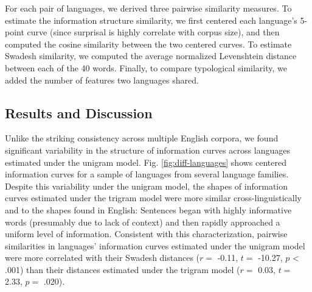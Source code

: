 \documentclass[10pt, letterpaper]{article}
\begin{document}
For each pair of languages, we derived three pairwise similarity
measures. To estimate the information structure similarity, we first
centered each language's 5-point curve (since surprisal is highly
correlate with corpus size), and then computed the cosine similarity
between the two centered curves. To estimate Swadesh similarity, we
computed the average normalized Levenshtein distance between each of the
40 words. Finally, to compare typological similarity, we added the
number of features two languages shared.

\hypertarget{results-and-discussion-2}{%
\subsection{Results and Discussion}\label{results-and-discussion-2}}

Unlike the striking consistency across multiple English corpora, we
found significant variability in the structure of information curves
across languages estimated under the unigram model. Fig.
\ref{fig:diff-languages} shows centered information curves for a sample
of languages from several language families. Despite this variability
under the unigram model, the shapes of information curves estimated
under the trigram model were more similar cross-linguistically and to
the shapes found in English: Sentences began with highly informative
words (presumably due to lack of context) and then rapidly approached a
uniform level of information. Consistent with this characterization,
pairwise similarities in languages' information curves estimated under
the unigram model were more correlated with their Swadesh distances
(\(r =\) -0.11, \(t =\) -10.27, \(p\) \textless{} .001) than their
distances estimated under the trigram model (\(r =\) 0.03, \(t =\) 2.33,
\(p =\) .020).
\end{document}
